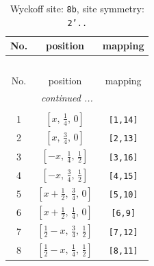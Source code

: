 \documentclass[fleqn,8pt]{jsarticle}
\begin{document}
\begin{longtable}{ccc}
\caption{Wyckoff site: {\tt 8b}, site symmetry: {\tt 2'..}}
 \\
 \hline \hline
No. & position & mapping \\ \hline \endfirsthead

\multicolumn{2}{l}{\tablename\ \thetable{}} \\
 \hline \hline
No. & position & mapping \\ \hline \endhead

 \hline \hline
\multicolumn{2}{r}{\footnotesize\it continued ...} \\ \endfoot

 \hline \hline
\multicolumn{2}{r}{} \\ \endlastfoot

1 & $\left[ x,\, \frac{1}{4},\, 0 \right]$ & {\tt [1,14]} \\ \hline
2 & $\left[ x,\, \frac{3}{4},\, 0 \right]$ & {\tt [2,13]} \\ \hline
3 & $\left[ - x,\, \frac{1}{4},\, \frac{1}{2} \right]$ & {\tt [3,16]} \\ \hline
4 & $\left[ - x,\, \frac{3}{4},\, \frac{1}{2} \right]$ & {\tt [4,15]} \\ \hline
5 & $\left[ x + \frac{1}{2},\, \frac{3}{4},\, 0 \right]$ & {\tt [5,10]} \\ \hline
6 & $\left[ x + \frac{1}{2},\, \frac{1}{4},\, 0 \right]$ & {\tt [6,9]} \\ \hline
7 & $\left[ \frac{1}{2} - x,\, \frac{3}{4},\, \frac{1}{2} \right]$ & {\tt [7,12]} \\ \hline
8 & $\left[ \frac{1}{2} - x,\, \frac{1}{4},\, \frac{1}{2} \right]$ & {\tt [8,11]} \\
\end{longtable}
\renewcommand{\arraystretch}{1.2}
\end{document}
